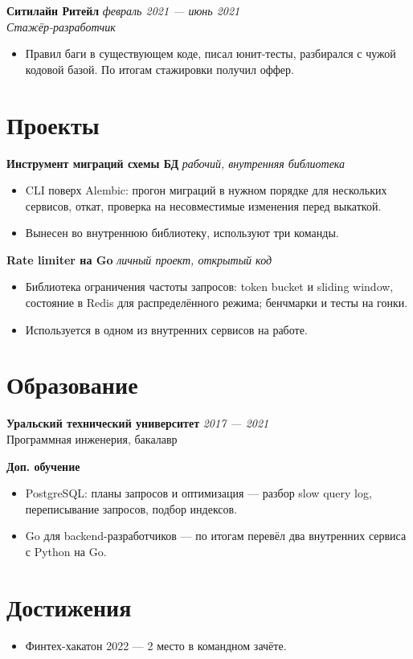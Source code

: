 \documentclass[a4paper,10pt]{article}
\begin{document}
\textbf{Ситилайн Ритейл} \hfill \textit{февраль 2021 --- июнь 2021}\\
\textit{Стажёр-разработчик}
\begin{itemize}
    \item Правил баги в существующем коде, писал юнит-тесты, разбирался с чужой
          кодовой базой. По итогам стажировки получил оффер.
\end{itemize}

\section*{Проекты}

\textbf{Инструмент миграций схемы БД} \hfill \textit{рабочий, внутренняя библиотека}
\begin{itemize}
    \item CLI поверх Alembic: прогон миграций в нужном порядке для нескольких
          сервисов, откат, проверка на несовместимые изменения перед выкаткой.
    \item Вынесен во внутреннюю библиотеку, используют три команды.
\end{itemize}

\textbf{Rate limiter на Go} \hfill \textit{личный проект, открытый код}
\begin{itemize}
    \item Библиотека ограничения частоты запросов: token bucket и sliding window,
          состояние в Redis для распределённого режима; бенчмарки и тесты на гонки.
    \item Используется в одном из внутренних сервисов на работе.
\end{itemize}

\section*{Образование}

\textbf{Уральский технический университет} \hfill \textit{2017 --- 2021}\\
Программная инженерия, бакалавр

\textbf{Доп. обучение}
\begin{itemize}
    \item PostgreSQL: планы запросов и оптимизация --- разбор slow query log,
          переписывание запросов, подбор индексов.
    \item Go для backend-разработчиков --- по итогам перевёл два внутренних сервиса
          с Python на Go.
\end{itemize}

\section*{Достижения}

\begin{itemize}
    \item Финтех-хакатон 2022 --- 2 место в командном зачёте.
\end{itemize}
\end{document}
